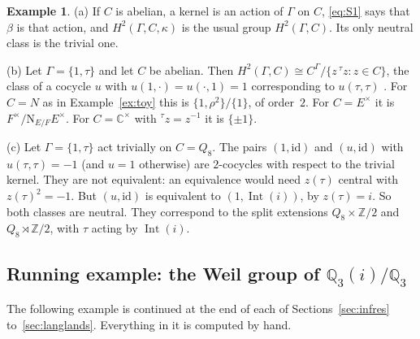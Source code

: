\documentclass[12pt,letterpaper]{article}
\numberwithin{equation}{section}
\theoremstyle{plain}
\theoremstyle{definition}
\newtheorem{example}[theorem]{Example}
\newcommand{\Z}{\mathbb{Z}}
\newcommand{\C}{\mathbb{C}}
\newcommand{\Q}{\mathbb{Q}}
\newcommand{\act}[2]{{}^{#1}\!#2}          %
\DeclareMathOperator{\Int}{Int}
\newcommand{\Nm}{\mathrm{N}_{E/F}}
\begin{document}
\begin{example}\label{ex:H2}
(a) If $C$ is abelian, a kernel is an action of $\Gamma$ on $C$,
\eqref{eq:S1} says that $\beta$ is that action, and
$H^2(\Gamma,C,\kappa)$ is the usual group $H^2(\Gamma,C)$. Its only
neutral class is the trivial one.

(b) Let $\Gamma=\{1,\tau\}$ and let $C$ be abelian. Then
$H^2(\Gamma,C)\cong C^\Gamma/\{z\,\act{\tau}{z}:z\in C\}$, the class of a
cocycle $u$ with $u(1,\cdot)=u(\cdot,1)=1$ corresponding to $u(\tau,\tau)$
\cite[Ch.~VIII, \S4]{Se79}. For $C=N$ as in Example~\ref{ex:toy} this is
$\{1,\rho^2\}/\{1\}$, of order~$2$. For $C=E^\times$ it is
$F^\times/\Nm E^\times$. For $C=\C^\times$ with $\act{\tau}{z}=z^{-1}$ it
is $\{\pm1\}$.

(c) Let $\Gamma=\{1,\tau\}$ act trivially on $C=Q_8$. The pairs
$(1,\mathrm{id})$ and $(u,\mathrm{id})$ with $u(\tau,\tau)=-1$ (and $u=1$
otherwise) are $2$-cocycles with respect to the trivial kernel. They are
not equivalent: an equivalence would need $z(\tau)$ central with
$z(\tau)^2=-1$. But $(u,\mathrm{id})$ is equivalent to $(1,\Int(i))$, by
$z(\tau)=i$. So both classes are neutral. They correspond to the split
extensions $Q_8\times\Z/2$ and $Q_8\rtimes\Z/2$, with $\tau$ acting by
$\Int(i)$.
\end{example}

\subsection{Running example: the Weil group of \texorpdfstring{$\Q_3(i)/\Q_3$}{Q3(i)/Q3}}\label{ss:run1}

The following example is continued at the end of each of
Sections~\ref{sec:infres} to~\ref{sec:langlands}. Everything in it is
computed by hand.
\end{document}
